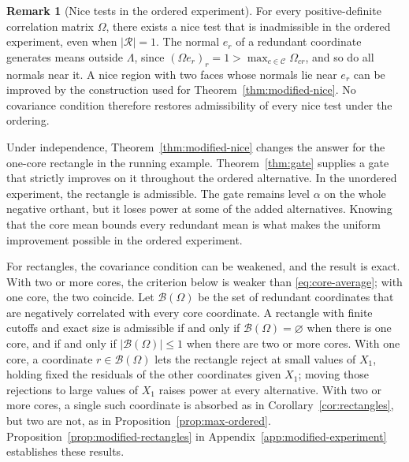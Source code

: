 \documentclass[11pt]{article}
\newcommand{\red}[1]{{\color{red}#1}} %
\numberwithin{equation}{section}
\theoremstyle{definition}
\newtheorem{remark}{Remark}
\begin{document}
\red{%
\begin{remark}[Nice tests in the ordered experiment]\label{rem:ordered-nice}
For every positive-definite correlation matrix $\Omega$, there exists a nice test that is inadmissible in the ordered experiment, even when $|\mathcal R|=1$. The normal $e_r$ of a redundant coordinate generates means outside $\Lambda$, since $(\Omega e_r)_r=1>\max_{c\in\mathcal C}\Omega_{cr}$, and so do all normals near it. A nice region with two faces whose normals lie near $e_r$ can be improved by the construction used for Theorem~\ref{thm:modified-nice}. No covariance condition therefore restores admissibility of every nice test under the ordering.
\end{remark}
}

Under independence, Theorem~\ref{thm:modified-nice} changes the answer for the one-core rectangle in the running example. Theorem~\ref{thm:gate} supplies a gate that strictly improves on it throughout the ordered alternative. In the \red{unordered} experiment, the rectangle is admissible. The gate remains level $\alpha$ on the whole negative orthant, but it loses power at some of the added alternatives. Knowing that the core mean bounds every redundant mean is what makes the uniform improvement possible in the ordered experiment.

\red{For rectangles, the covariance condition can be weakened, and the result is exact. With two or more cores, the criterion below is weaker than \eqref{eq:core-average}; with one core, the two coincide. Let $\mathcal B(\Omega)$ be the set of redundant coordinates that are negatively correlated with every core coordinate. A rectangle with finite cutoffs and exact size is admissible if and only if $\mathcal B(\Omega)=\varnothing$ when there is one core, and if and only if $|\mathcal B(\Omega)|\le1$ when there are two or more cores. With one core, a coordinate $r\in\mathcal B(\Omega)$ lets the rectangle reject at small values of $X_1$, holding fixed the residuals of the other coordinates given $X_1$; moving those rejections to large values of $X_1$ raises power at every alternative. With two or more cores, a single such coordinate is absorbed as in Corollary~\ref{cor:rectangles}, but two are not, as in Proposition~\ref{prop:max-ordered}. Proposition~\ref{prop:modified-rectangles} in Appendix~\ref{app:modified-experiment} establishes these results.}
\end{document}
